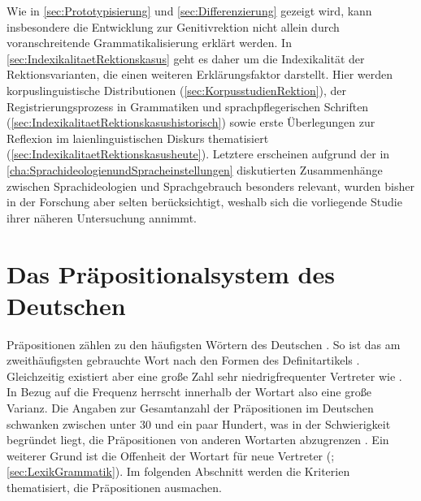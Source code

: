 Wie in \autoref{sec:Prototypisierung} und \autoref{sec:Differenzierung} gezeigt wird, kann insbesondere die Entwicklung zur Genitivrektion nicht allein durch voranschreitende Grammatikalisierung erklärt werden. 
In \autoref{sec:IndexikalitaetRektionskasus} geht es daher um die Indexikalität der Rektionsvarianten, die einen weiteren Erklärungsfaktor darstellt. 
Hier werden korpuslinguistische Distributionen (\autoref{sec:KorpusstudienRektion}), der Registrierungsprozess in Grammatiken und sprachpflegerischen Schriften (\autoref{sec:IndexikalitaetRektionskasushistorisch}) sowie erste Überlegungen zur Reflexion im laienlinguistischen Diskurs thematisiert (\autoref{sec:IndexikalitaetRektionskasusheute}). 
Letztere erscheinen aufgrund der in \autoref{cha:SprachideologienundSpracheinstellungen} diskutierten Zusammenhänge zwischen Sprachideologien und Sprachgebrauch besonders relevant, wurden bisher in der Forschung aber selten berücksichtigt, weshalb sich die vorliegende Studie ihrer näheren Untersuchung annimmt. 
\section{Das Präpositionalsystem des Deutschen} \label{sec:PraepDE}
Präpositionen zählen zu den häufigsten Wörtern des Deutschen \citep[s.][636--637]{Griehaber2009}. 
So ist  das am zweithäufigsten gebrauchte Wort nach den Formen des Definitartikels \citep[s.][]{InstitutfurDeutscheSprache2012}. 
Gleichzeitig existiert aber eine große Zahl sehr niedrigfrequenter Vertreter wie . 
In Bezug auf die Frequenz herrscht innerhalb der Wortart also eine große Varianz. 
Die Angaben zur Gesamtanzahl der Präpositionen im Deutschen schwanken zwischen unter 30 und ein paar Hundert, was in der Schwierigkeit begründet liegt, die Präpositionen von anderen Wortarten abzugrenzen \citep[s.][262]{Lindqvist1994}. 
Ein weiterer Grund ist die Offenheit der Wortart für neue Vertreter (\cites[s.][526]{Eisenberg1979}[17]{Lehmann1992}[§1429]{Duden2022}[354]{Helbig.2017}; \autoref{sec:LexikGrammatik}).
Im folgenden Abschnitt werden die Kriterien thematisiert, die Präpositionen ausmachen. 

